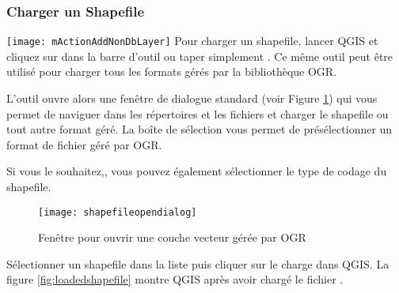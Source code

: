\subsubsection{Charger un Shapefile}\label{sec:load_shapefile}
\texttt{[image: mActionAddNonDbLayer]}
Pour charger un shapefile, lancer QGIS et cliquez sur  dans la barre d'outil ou taper simplement . Ce m\^eme outil peut \^etre utilis\'e pour charger tous les formats g\'er\'es par la biblioth\`eque OGR.

L'outil ouvre alors une fen\^etre de dialogue standard (voir Figure \ref{fig:openshapefile}) qui vous permet de naviguer dans les r\'epertoires et les fichiers et charger le shapefile ou tout autre format g\'er\'e.
La bo\^ite de s\'election  vous permet de pr\'es\'electionner un format de fichier g\'er\'e par OGR.

Si vous le souhaitez,, vous pouvez \'egalement s\'electionner le type de codage du shapefile.

\begin{figure}[ht]
  \begin{center}
  \caption{Fen\^etre pour ouvrir une couche vecteur g\'er\'ee par OGR \nixcaption}\label{fig:openshapefile}\smallskip
  \texttt{[image: shapefileopendialog]}
\end{center}
\end{figure}

S\'electionner un shapefile dans la liste puis cliquer sur  le charge dans QGIS. La figure \ref{fig:loadedshapefile} montre QGIS apr\`es avoir charg\'e le fichier .

